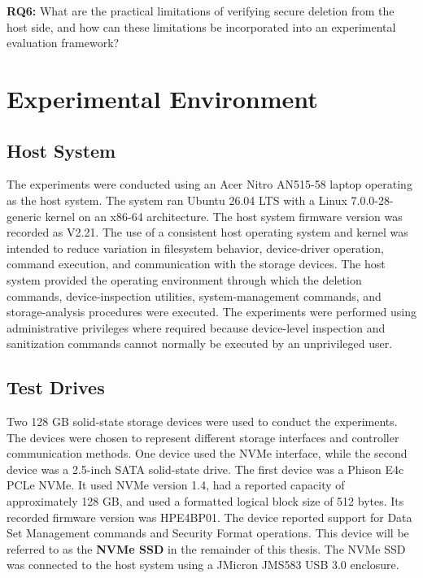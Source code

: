\textbf{RQ6:} What are the practical limitations of verifying secure deletion from the host side, and how can these limitations be incorporated 
into an experimental evaluation framework?



\section{Experimental Environment}

\subsection*{Host System}

The experiments were conducted using an Acer Nitro AN515-58 laptop operating as the host system. The system ran Ubuntu 26.04 LTS with a Linux 
7.0.0-28-generic kernel on an x86-64 architecture. The host system firmware version was recorded as V2.21. The use of a consistent host 
operating system and kernel was intended to reduce variation in filesystem behavior, device-driver operation, command execution, and 
communication with the storage devices. The host system provided the operating environment through which the deletion commands, device-inspection 
utilities, system-management commands, and storage-analysis procedures were executed. The experiments were performed using administrative privileges 
where required because device-level inspection and sanitization commands cannot normally be executed by an unprivileged user.


\subsection*{Test Drives}

Two 128 GB solid-state storage devices were used to conduct the experiments. The devices were chosen to represent different storage interfaces and 
controller communication methods. One device used the NVMe interface, while the second device was a 2.5-inch SATA solid-state drive. The first device 
was a Phison E4c PCLe NVMe. It used NVMe version 1.4, had a reported capacity of approximately 128 GB, and used a formatted logical block size of 512 bytes. 
Its recorded firmware version was HPE4BP01. The device reported support for Data Set Management commands and Security Format operations. This device will be 
referred to as the \textbf{NVMe SSD} in the remainder of this thesis. The NVMe SSD was connected to the host system using a JMicron JMS583 USB 3.0 enclosure.

